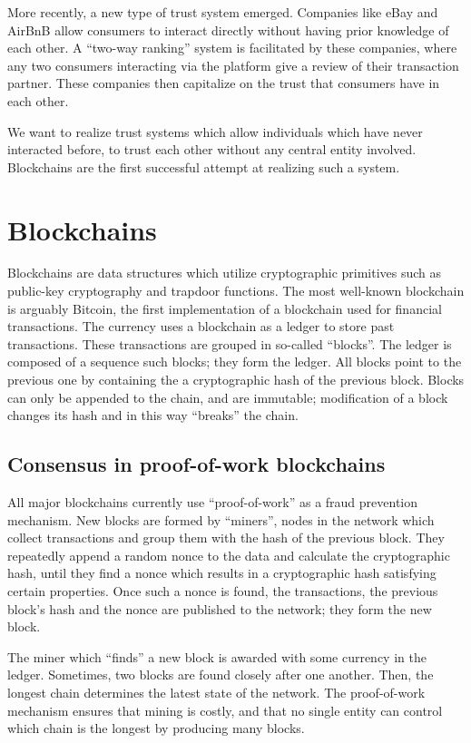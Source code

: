 More recently, a new type of trust system emerged. Companies like eBay and AirBnB allow consumers to interact directly without having prior knowledge of each other. A ``two-way ranking'' system is facilitated by these companies, where any two consumers interacting via the platform give a review of their transaction partner. These companies then capitalize on the trust that consumers have in each other.

We want to realize trust systems which allow individuals which have never interacted before, to trust each other without any central entity involved. Blockchains are the first successful attempt at realizing such a system. 

\section{Blockchains}
Blockchains are data structures which utilize cryptographic primitives such as public-key cryptography and trapdoor functions. The most well-known blockchain is arguably Bitcoin, the first implementation of a blockchain used for financial transactions. The currency uses a blockchain as a ledger to store past transactions. These transactions are grouped in so-called ``blocks''. The ledger is composed of a sequence such blocks; they form the ledger. All blocks point to the previous one by containing the a cryptographic hash of the previous block. Blocks can only be appended to the chain, and are immutable; modification of a block changes its hash and in this way ``breaks'' the chain.

\subsection{Consensus in proof-of-work blockchains}
All major blockchains currently use ``proof-of-work'' as a fraud prevention mechanism. New blocks are formed by ``miners'', nodes in the network which collect transactions and group them with the hash of the previous block. They repeatedly append a random nonce to the data and calculate the cryptographic hash, until they find a nonce which results in a cryptographic hash satisfying certain properties. Once such a nonce is found, the transactions, the previous block's hash and the nonce are published to the network; they form the new block. 

The miner which ``finds'' a new block is awarded with some currency in the ledger. Sometimes, two blocks are found closely after one another. Then, the longest chain determines the latest state of the network. The proof-of-work mechanism ensures that mining is costly, and that no single entity can control which chain is the longest by producing many blocks.

